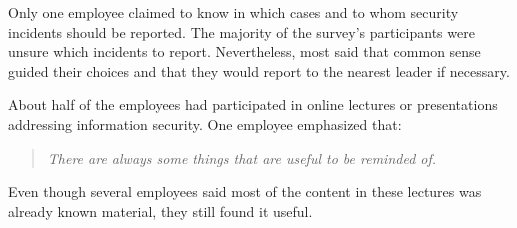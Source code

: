 Only one employee claimed to know in which cases and to whom security incidents should be reported. The majority of the survey's participants were unsure which incidents to report. Nevertheless, most said that common sense guided their choices and that they would report to the nearest leader if necessary.

About half of the employees had participated in online lectures or presentations addressing information security. One employee emphasized that:

\begin{quote}
\textit{There are always some things that are useful to be reminded of.}
\end{quote}

Even though several employees said most of the content in these lectures was already known material, they still found it useful.
